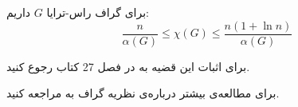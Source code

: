 \begin{theorem}
	\label{thm:vertexx}
	برای گراف راس-ترایا
	$G$
	داریم:
	$$\dfrac{n}{\alpha(G)} \leq \chi(G) \leq \dfrac{n(1 + \ln n)}{\alpha(G)}$$
\end{theorem}
	برای اثبات این قضیه به
	در فصل 27 کتاب
	\cite{graham1995handbook}
	رجوع کنید.
	
	برای مطالعه‌ی بیشتر درباره‌ی نظریه گراف به
\cite{west}
مراجعه کنید.

